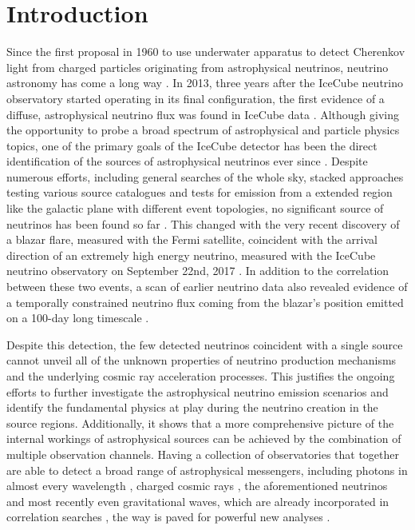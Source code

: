 \chapter{Introduction}

Since the first proposal in  1960 to use underwater apparatus to detect Cherenkov light from charged particles originating from astrophysical neutrinos, neutrino astronomy has come a long way \cite{Markov:1960vja}.
In 2013, three years after the IceCube neutrino observatory started operating in its final configuration, the first evidence of a diffuse, astrophysical neutrino flux was found in IceCube data \cite{Aartsen:2013jdh,Aartsen:2016nxy}.
Although giving the opportunity to probe a broad spectrum of astrophysical and particle physics topics, one of the primary goals of the IceCube detector has been the direct identification of the sources of astrophysical neutrinos ever since \cite{Katz:2011ke,GOLDSCHMIDT:2002ICScienceGoals}.
Despite numerous efforts, including general searches of the whole sky, stacked approaches testing various source catalogues and tests for emission from a extended region like the galactic plane with different event topologies, no significant source of neutrinos has been found so far \cite{Ahlers:2014ioa,Aartsen:2016oji,Aartsen:2013jdh,Aartsen:2016qcr,Adrian-Martinez:2015ver,Aartsen:2016tpb,IceCube:2018cha,Aartsen:2015dml,Abbasi:2009kq,Aartsen:2014PS4yrs,Aartsen:2015wto}.
This changed with the very recent discovery of a blazar flare, measured with the Fermi satellite, coincident with the arrival direction of an extremely high energy neutrino, measured with the IceCube neutrino observatory on September 22nd, 2017 \cite{Keivani:2018rnh}.
In addition to the correlation between these two events, a scan of earlier neutrino data also revealed evidence of a temporally constrained neutrino flux coming from the blazar's position emitted on a 100-day long timescale \cite{IceCube:2018cha}.

Despite this detection, the few detected neutrinos coincident with a single source cannot unveil all of the unknown properties of neutrino production mechanisms and the underlying cosmic ray acceleration processes.
This justifies the ongoing efforts to further investigate the astrophysical neutrino emission scenarios and identify the fundamental physics at play during the neutrino creation in the source regions.
Additionally, it shows that a more comprehensive picture of the internal workings of astrophysical sources can be achieved by the combination of multiple observation channels.
Having a collection of observatories that together are able to detect a broad range of astrophysical messengers, including photons in almost every wavelength \cite{Huber:2016Photons}, charged cosmic rays \cite{BLANDFORD:2014CRs,Sommers:2009CRs}, the aforementioned neutrinos and most recently even gravitational waves, which are already incorporated in correlation searches \cite{Abbott:2016blz,Adrian-Martinez:2016xgn}, the way is paved for powerful new analyses \cite{Branchesi:2016MultiMessenger}.

